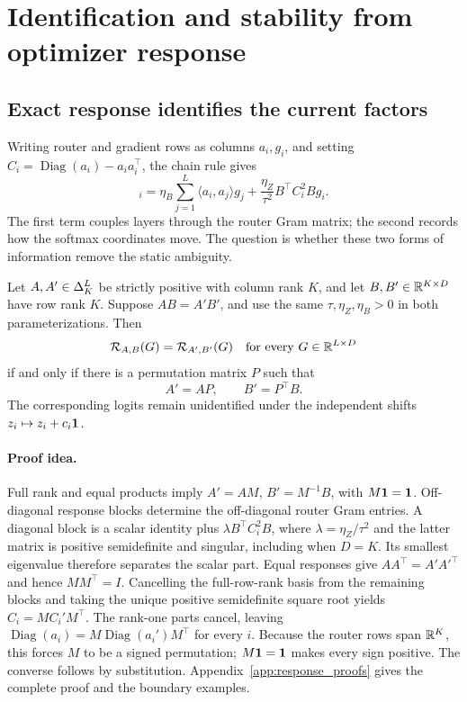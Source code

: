 \section{Identification and stability from optimizer response}
\label{sec:theory}
\subsection{Exact response identifies the current factors}
\label{sec:response_identifiability}

Writing router and gradient rows as columns $a_i,g_i$, and setting
$C_i=\operatorname{Diag}(a_i)-a_ia_i^\top$, the chain rule gives
\begin{equation}
 [\mathcal R_{A,B}(G)]_i
 =\eta_B\sum_{j=1}^L\langle a_i,a_j\rangle g_j
  +\frac{\eta_Z}{\tau^2}B^\top C_i^2B g_i.
 \label{eq:response_blocks}
\end{equation}
The first term couples layers through the router Gram matrix; the second
records how the softmax coordinates move. The question is whether these
two forms of information remove the static ambiguity.

\begin{theorem}
\label{thm:response_stabilizer}
Let \(A,A'\in\Delta_K^L\) be strictly positive with column rank \(K\),
and let \(B,B'\in\mathbb{R}^{K\times D}\) have row rank \(K\).  Suppose
\(AB=A'B'\), and use the same \(\tau,\eta_Z,\eta_B>0\) in both
parameterizations.  Then
\begin{equation}
 \mathcal R_{A,B}(G)=\mathcal R_{A',B'}(G)
 \quad\text{for every }G\in\mathbb{R}^{L\times D}
 \label{eq:response_equal}
\end{equation}
if and only if there is a permutation matrix \(P\) such that
\begin{equation}
 A'=AP,\qquad B'=P^\top B.
 \label{eq:response_permutation}
\end{equation}
The corresponding logits remain unidentified under the independent shifts
\(z_i\mapsto z_i+c_i\mathbf{1}\).
\end{theorem}


\paragraph{Proof idea.}
Full rank and equal products imply $A'=AM$, $B'=M^{-1}B$, with
$M\mathbf{1}=\mathbf{1}$. Off-diagonal response blocks determine the off-diagonal
router Gram entries. A diagonal block is a scalar identity plus
$\lambda B^\top C_i^2B$, where $\lambda=\eta_Z/\tau^2$ and the latter
matrix is positive semidefinite and singular, including when $D=K$.
Its smallest eigenvalue therefore separates the scalar part. Equal
responses give $AA^\top=A'A'^\top$ and hence $MM^\top=I$.
Cancelling the full-row-rank basis from the remaining blocks and taking
the unique positive semidefinite square root yields
$C_i=M C_i'M^\top$.
The rank-one parts cancel, leaving
$\operatorname{Diag}(a_i)=M\operatorname{Diag}(a_i')M^\top$ for every $i$.
Because the router rows span $\mathbb{R}^K$, this forces $M$ to be a signed
permutation; $M\mathbf{1}=\mathbf{1}$ makes every sign positive.
The converse follows by substitution. Appendix~\ref{app:response_proofs}
gives the complete proof and the boundary examples.

